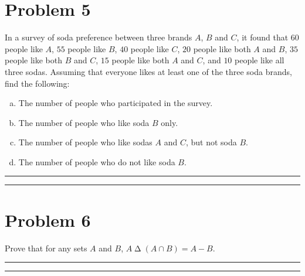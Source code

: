 \documentclass{article}
\theoremstyle{definition}
\newenvironment{solution}{\bigskip\hrule{\hfill}}{\bigskip\hrule{\hfill}} %
\begin{document}

\newpage


\section*{Problem 5}
In a survey of soda preference between three brands $A$, $B$ and $C$, it found that $60$ people like $A$, $55$ people like $B$, $40$ people like $C$, $20$ people like both $A$ and $B$, $35$ people like both $B$ and $C$, $15$ people like both $A$ and $C$, and $10$ people like all three sodas. Assuming that everyone likes at least one of the three soda brands, find the following:
\begin{enumerate}[a)] %
    \item The number of people who participated in the survey.
    \item The number of people who like soda $B$ only.
    \item The number of people who like sodas $A$ and $C$, but not soda $B$.
    \item The number of people who do not like soda $B$.
\end{enumerate}
\begin{solution}


\end{solution}


\newpage


\section*{Problem 6}
Prove that for any sets $A$ and $B$, $A\mathrel{\Delta}\left(A\cap B\right)=A-B$.
\begin{solution}


\end{solution}
\end{document}
